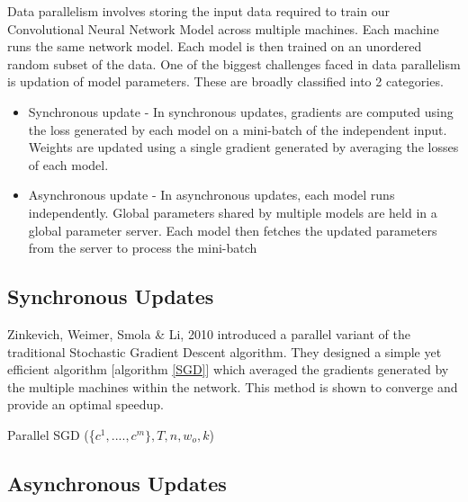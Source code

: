 \documentclass[sigconf]{acmart}
\begin{document}
Data parallelism involves storing the input data required to train our Convolutional Neural Network Model across multiple machines. Each machine runs the same network model. Each model is then trained on an unordered random subset of the data. One of the biggest challenges faced in data parallelism is updation of model parameters. These are broadly classified into 2 categories.

\begin{itemize}
\setlength\itemsep{1em}
\item Synchronous update - In synchronous updates, gradients are computed using the loss generated by each model on a mini-batch of the independent input. Weights are updated using a single gradient generated by averaging the losses of each model.

\item Asynchronous update - In asynchronous updates, each model runs independently. Global parameters shared by multiple models are held in a global parameter server. Each model then fetches the updated parameters from the server to process the mini-batch
\end{itemize}


\subsection{Synchronous Updates}

Zinkevich, Weimer,  Smola \& Li, 2010 \cite{NIPS2010-4006} introduced a parallel variant of the traditional Stochastic Gradient Descent algorithm.  They designed a simple yet efficient algorithm [algorithm \ref{SGD}] which averaged the gradients generated by the multiple machines within the network. This method is shown to converge and provide an optimal speedup.

\begin{algorithm}

\caption{Parallel SGD (\{$ c^1,....,c^m\} , T, n, w_o,k$)}\label{SGD}

\begin{algorithmic}[1] 

\EndFor
{}
\end{algorithmic}

\end{algorithm}


\subsection{Asynchronous Updates}
\end{document}
